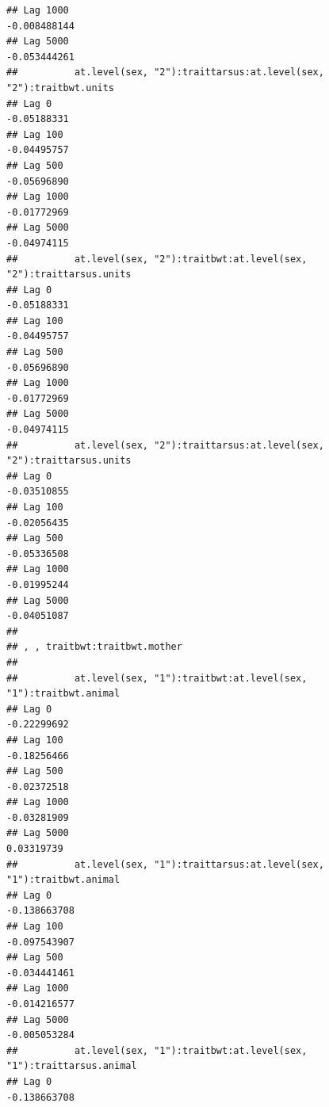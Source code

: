 \documentclass[
  12pt,
]{book}
\begin{document}
\begin{verbatim}
## Lag 1000                                                  -0.008488144
## Lag 5000                                                  -0.053444261
##          at.level(sex, "2"):traittarsus:at.level(sex, "2"):traitbwt.units
## Lag 0                                                         -0.05188331
## Lag 100                                                       -0.04495757
## Lag 500                                                       -0.05696890
## Lag 1000                                                      -0.01772969
## Lag 5000                                                      -0.04974115
##          at.level(sex, "2"):traitbwt:at.level(sex, "2"):traittarsus.units
## Lag 0                                                         -0.05188331
## Lag 100                                                       -0.04495757
## Lag 500                                                       -0.05696890
## Lag 1000                                                      -0.01772969
## Lag 5000                                                      -0.04974115
##          at.level(sex, "2"):traittarsus:at.level(sex, "2"):traittarsus.units
## Lag 0                                                            -0.03510855
## Lag 100                                                          -0.02056435
## Lag 500                                                          -0.05336508
## Lag 1000                                                         -0.01995244
## Lag 5000                                                         -0.04051087
## 
## , , traitbwt:traitbwt.mother
## 
##          at.level(sex, "1"):traitbwt:at.level(sex, "1"):traitbwt.animal
## Lag 0                                                       -0.22299692
## Lag 100                                                     -0.18256466
## Lag 500                                                     -0.02372518
## Lag 1000                                                    -0.03281909
## Lag 5000                                                     0.03319739
##          at.level(sex, "1"):traittarsus:at.level(sex, "1"):traitbwt.animal
## Lag 0                                                         -0.138663708
## Lag 100                                                       -0.097543907
## Lag 500                                                       -0.034441461
## Lag 1000                                                      -0.014216577
## Lag 5000                                                      -0.005053284
##          at.level(sex, "1"):traitbwt:at.level(sex, "1"):traittarsus.animal
## Lag 0                                                         -0.138663708

\end{verbatim}
\end{document}
